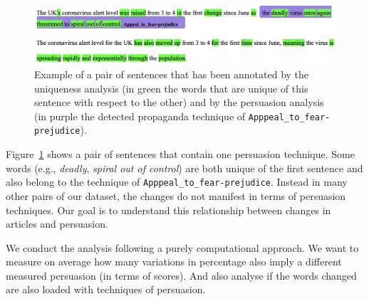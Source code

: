 \begin{figure}[!htbp]
    \centering
    \includegraphics[width=\linewidth]{figures/annotation_212_annotated.png}
    \caption{Example of a pair of sentences that has been annotated by the uniqueness analysis (in green the words that are unique of this sentence with respect to the other) and by the persuasion analysis (in purple the detected propaganda technique of \texttt{Apppeal\_to\_fear-prejudice}).}
    \label{fig:annotated_clique_data}
\end{figure}

Figure~\ref{fig:annotated_clique_data} shows a pair of sentences that contain one persuasion technique. Some words (e.g., \emph{deadly}, \emph{spiral out of control}) are both unique of the first sentence and also belong to the technique of \texttt{Apppeal\_to\_fear-prejudice}. Instead in many other pairs of our dataset, the changes do not manifest in terms of persuasion techniques.
Our goal is to understand this relationship between changes in articles and persuasion.

We conduct the analysis following a purely computational approach.
%
We want to measure on average how many variations in percentage also imply a different measured persuasion (in terms of scores). %
And also analyse if the words changed are also loaded with techniques of persuasion.


